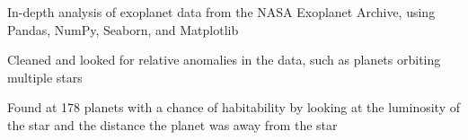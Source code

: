 \documentclass[]{resume-template}
\begin{document}
\begin{minipage}[t]{0.66\textwidth}

        \label{subsec:exo-eda}
        \begin{tightemize}
            \item In-depth analysis of exoplanet data from the NASA Exoplanet Archive, using Pandas, NumPy,
            Seaborn, and Matplotlib
            \item Cleaned and looked for relative anomalies in the data, such as planets orbiting multiple stars
            \item Found at 178 planets with a chance of habitability by looking at the luminosity of the star and the distance the planet was away from the star

        \end{tightemize}
        \vspace{\topsep}


\end{minipage}
\end{document}
